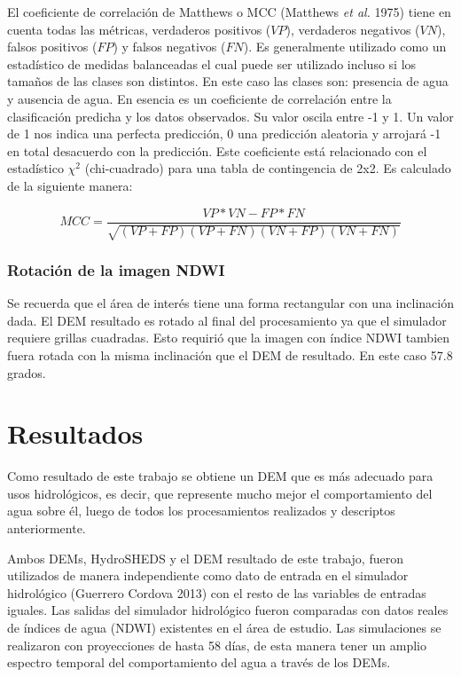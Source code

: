\documentclass[10pt,a4paper, twoside]{report}
\begin{document}
El coeficiente de correlación de Matthews o MCC (Matthews \textit{et al.} 1975) tiene en cuenta todas las métricas, verdaderos positivos ($VP$), verdaderos negativos ($VN$), falsos positivos ($FP$) y falsos negativos ($FN$). Es generalmente utilizado como un estadístico de medidas balanceadas el cual puede ser utilizado incluso si los tamaños de las clases son distintos. En este caso las clases son: presencia de agua y ausencia de agua. En esencia es un coeficiente de correlación entre la clasificación predicha y los datos observados. Su valor oscila entre -1 y 1. Un valor de 1 nos indica una perfecta predicción, 0 una predicción aleatoria y arrojará -1 en total desacuerdo con la predicción. Este coeficiente está relacionado con el estadístico ${\chi}^2$ (chi-cuadrado) para una tabla de contingencia de 2x2. Es calculado de la siguiente manera:


\begin{equation}
MCC=\frac{VP*VN - FP*FN}{\sqrt{(VP+FP)(VP+FN)(VN+FP)(VN+FN)}}
\end{equation}



\subsection{Rotación de la imagen NDWI}

Se recuerda que el área de interés tiene una forma rectangular con una inclinación dada. El DEM resultado es rotado al final del procesamiento ya que el simulador requiere grillas cuadradas. Esto requirió que la imagen con índice NDWI tambien fuera rotada con la misma inclinación que el DEM de resultado. En este caso 57.8 grados.



\chapter{Resultados}

Como resultado de este trabajo se obtiene un DEM que es más adecuado para usos hidrológicos, es decir, que represente mucho mejor el comportamiento del agua sobre él, luego de todos los procesamientos realizados y descriptos anteriormente.


Ambos DEMs, HydroSHEDS y el DEM resultado de este trabajo, fueron utilizados de manera independiente como dato de entrada en el simulador hidrológico (Guerrero Cordova 2013) con el resto de las variables de entradas iguales. Las salidas del simulador hidrológico fueron comparadas con datos reales de índices de agua (NDWI) existentes en el área de estudio. Las simulaciones se realizaron con proyecciones de hasta 58 días, de esta manera tener un amplio espectro temporal del comportamiento del agua a través de los DEMs.
\end{document}
